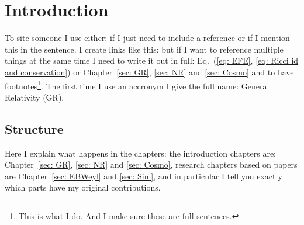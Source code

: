\chapter{Introduction}

To site someone I use either: \citep{I.Newton_1687} if I just need to include a reference or \citet{I.Newton_1687} if I mention this in the sentence. I create links like this: 
 but if I want to reference multiple things at the same time I need to write it out in full: Eq.~(\ref{eq: EFE}, \ref{eq: Ricci id and conservation}) or Chapter~\ref{sec: GR}, \ref{sec: NR} and \ref{sec: Cosmo}
and to have footnotes\footnote{This is what I do. And I make sure these are full sentences.}.
The first time I use an accronym I give the full name: General Relativity (GR).

\section{Structure}

Here I explain what happens in the chapters: the introduction chapters are: Chapter~\ref{sec: GR}, \ref{sec: NR} and \ref{sec: Cosmo}, research chapters based on papers are Chapter~\ref{sec: EBWeyl} and \ref{sec: Sim}, and in particular I tell you exactly which parts have my original contributions.
